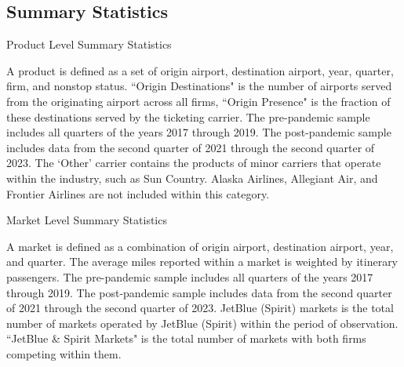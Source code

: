 \documentclass{article}
\begin{document}
\subsection{Summary Statistics}
   \begin{table}
    \caption{Product Level Summary Statistics}
    \label{tab:Summary_Statistics_Product}
                    \vspace{-15mm}
                    \begin{center}
    
                        \end{center}
                    \vspace{-5mm}
    \footnotesize{A product is defined as a set of origin airport, destination airport, year, quarter, firm, and nonstop status. ``Origin Destinations" is the number of airports served from the originating airport across all firms, ``Origin Presence" is the fraction of these destinations served by the ticketing carrier. The pre-pandemic sample includes all quarters of the years 2017 through 2019. The post-pandemic sample includes data from the second quarter of 2021 through the second quarter of 2023. The `Other' carrier contains the products of minor carriers that operate within the industry, such as Sun Country. Alaska Airlines, Allegiant Air, and Frontier Airlines are not included within this category.}
    \end{table}

    \begin{table}
        \caption{Market Level Summary Statistics}
        \label{tab:Summary_Statistics_Market}
                \vspace{-15mm}
\begin{center}
            
            \end{center}
    \vspace{-5mm}
            \footnotesize{A market is defined as a combination of origin airport, destination airport, year, and quarter. The average miles reported within a market is weighted by itinerary passengers. The pre-pandemic sample includes all quarters of the years 2017 through 2019. The post-pandemic sample includes data from the second quarter of 2021 through the second quarter of 2023. JetBlue (Spirit) markets is the total number of markets operated by JetBlue (Spirit) within the period of observation. ``JetBlue \& Spirit Markets" is the total number of markets with both firms competing within them.}

    \end{table}
\end{document}
